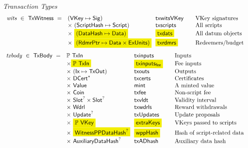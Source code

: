 \begin{figure*}[htb]
  \emph{Transaction Types}
  \begin{equation*}
    \begin{array}{r@{~~}l@{~~}l@{\qquad}l}
      \var{wits} ~\in~ \TxWitness ~=~
       & (\VKey \mapsto \Sig) & \fun{txwitsVKey} & \text{VKey signatures}\\
       & \times ~(\ScriptHash \mapsto \Script)  & \fun{txscripts} & \text{All scripts}\\
       & \times~ \hldiff{(\DataHash \mapsto \Data)} & \hldiff{\fun{txdats}} & \text{All datum objects}\\
       & \times ~\hldiff{(\RdmrPtr \mapsto \Data \times \ExUnits)}& \hldiff{\fun{txrdmrs}}& \text{Redeemers/budget}\\
    \end{array}
  \end{equation*}
  \begin{equation*}
    \begin{array}{r@{~~}l@{~~}l@{\qquad}l}
      \var{txbody} ~\in~ \TxBody ~=~
      & \powerset{\TxIn} & \fun{txinputs}& \text{Inputs}\\
      & \times \hldiff{\powerset{\TxIn}} & \hldiff{\fun{txinputs_{fee}}}& \text{Fee inputs}\\
      &\times ~(\Ix \mapsto \TxOut) & \fun{txouts}& \text{Outputs}\\
      & \times~ \seqof{\DCert} & \fun{txcerts}& \text{Certificates}\\
       & \times ~\Value  & \fun{mint} &\text{A minted value}\\
       & \times ~\Coin & \fun{txfee} &\text{Non-script fee}\\
       & \times ~\Slot^? \times \Slot^? & \fun{txvldt} & \text{Validity interval}\\
       & \times~ \Wdrl  & \fun{txwdrls} &\text{Reward withdrawals}\\
       & \times ~\Update^?  & \fun{txUpdates} & \text{Update proposals}\\
       & \times ~\hldiff{\powerset{\VKey}} & \hldiff{\fun{extraKeys}} & \text{VKeys passed to scripts}\\
       & \times ~\hldiff{\WitnessPPDataHash^?} & \hldiff{\fun{wppHash}} & \text{Hash of script-related data}\\
       & \times ~\AuxiliaryDataHash^? & \fun{txADhash} & \text{Auxiliary data hash}\\
    \end{array}

\end{equation*}
\end{figure*}
